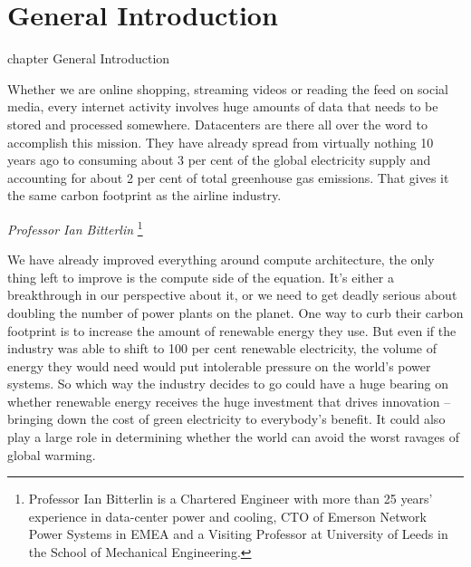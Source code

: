
\chapter*{General Introduction}  {chapter} {General Introduction}

Whether we are online shopping, streaming videos or reading the feed on social media, every
internet activity involves huge amounts of data that needs to be stored and processed
somewhere. Datacenters are there all over the word to accomplish this mission. They have
already spread from virtually nothing 10 years ago to consuming about 3 per cent of the
global electricity supply and accounting for about 2 per cent of total greenhouse gas
emissions. That gives it the same carbon footprint as the airline industry\cite{consumption-stats}.

\vspace{1cm}

\begin{flushright}
    \textit{Professor Ian Bitterlin}
    \footnote{
        Professor Ian Bitterlin is a Chartered Engineer with more than 25 years’ experience
        in data-center power and cooling, CTO of Emerson Network Power Systems in EMEA
        and a Visiting Professor at University of Leeds in the School of Mechanical Engineering.
    }
\end{flushright}
\vspace{0.5cm}

We have already improved everything around compute architecture, the only thing left to improve
is the compute side of the equation. It’s either a breakthrough in our perspective about it, or we
need to get deadly serious about doubling the number of power plants on the planet.
One way to curb their carbon footprint is to increase the amount of renewable energy they
use. But even if the industry was able to shift to 100 per cent renewable electricity, the volume
of energy they would need would put intolerable pressure on the world’s power systems.
So which way the industry decides to go could have a huge bearing on whether renewable energy
receives the huge investment that drives innovation – bringing down the cost of green electricity
to everybody’s benefit. It could also play a large role in determining whether the world can
avoid the worst ravages of global warming.


